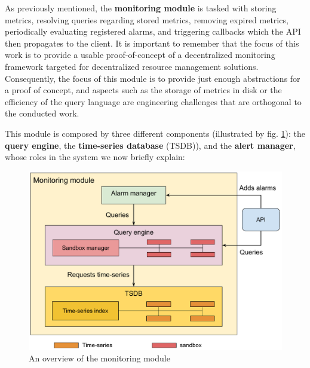 

As previously mentioned, the \textbf{monitoring module} is tasked with storing metrics, resolving queries regarding stored metrics, removing expired metrics, periodically evaluating registered alarms, and triggering callbacks which the API then propagates to the client. It is important to remember that the focus of this work is to provide a usable proof-of-concept of a decentralized monitoring framework targeted for decentralized resource management solutions. Consequently, the focus of this module is to provide just enough abstractions for a proof of concept, and aspects such as the storage of metrics in disk or the efficiency of the query language are engineering challenges that are orthogonal to the conducted work. 

This module is composed by three different components (illustrated by fig. \ref{fig:mon_module_overview}): the \textbf{query engine}, the \textbf{time-series database} (TSDB)), and the \textbf{alert manager}, whose roles in the system we now briefly explain:

\begin{figure}[htbp]
    \centering
    \includegraphics[width=\textwidth]{Chapters/mon_module/images/Monitoring_module.pdf}
    \caption{An overview of the monitoring module}
    \label{fig:mon_module_overview}
\end{figure}

